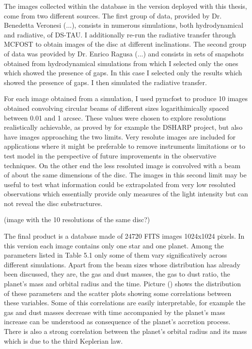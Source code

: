 \documentclass[a4paper,10pt]{report}
\begin{document}
The images collected within the database in the version deployed with this thesis, come from two different sources.
The first group of data, provided by Dr. Benedetta Veronesi (...), consists in numerous simulations, both hydrodynamical and radiative,
of DS-TAU. I additionally re-run the radiative transfer through MCFOST to obtain images of the disc at different inclinations.
The second group of data was provided by Dr. Enrico Ragusa (...) and consists in sets of snapshots
obtained from hydrodynamical simulations from which I selected only the ones which showed the presence of gaps.
In this case I selected only the results which showed the presence of gaps. I then simulated the radiative transfer.

For each image obtained from a simulation, I used pymcfost to produce 10 images obtained convolving circular beams of different sizes
logarithimically spaced between 0.01 and 1 arcsec. These values were chosen to explore resolutions
realistically achievable, as proved by for example the DSHARP project, but also have images approaching the two limits.
Very resolute images are included for applications where it might be preferable to remove instruments limitations
or to test model in the perspective of future improvements in the observative techniques. 
On the other end the less resoluted image is convolved with a beam of about the same dimensions of the disc. The
images in this second limit may be useful to test what information could be extrapolated from very low resoluted observations
which essentially provide only measures of the light intensity but can not reveal the disc substructures.

(image with the 10 resolutions of the same disc?)

The final product is a database made of 24720 FITS images 1024x1024 pixels. In this
version each image contains only one star and one planet.
Among the parameters listed in Table 5.1 only some of them vary significatively across different simulations.
Apart from the beam sizes whose distribution has already been discussed, they are, the gas and dust masses, the gas to dust ratio, 
the planet's mass and orbital radius and the time. Picture () shows the distribution of these parameters and the scatter
plots showing some correlations between these variables. Some of this correlations are easily interpretable, for example the
gas and dust masses decrease with time accompanied by the planet's mass increase can be understood as consequence of the planet's accretion
process. There is also a strong correlation between the planet's orbital radius and its mass which is due to the third Keplerian law.
\end{document}
